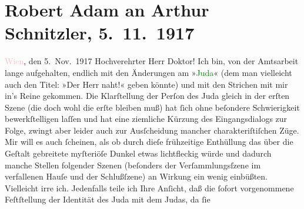 

               \section[Robert Adam an Arthur Schnitzler, 5. 11. 1917]{ Robert Adam an Arthur Schnitzler, 5. 11. 1917}\nopagebreak{}\rehead{ }\normalsize\beginnumbering{} \toendnotes[C]{\smallbreak\pagebreak[2]} 
\pstart
           \raggedleft{}{\pb}\textcolor{pink}{Wien}{}\ledrightnote{\textcolor{pink}{Wien}}, den 5. Nov. 1917\pend
           \pstart\center{}Hochverehrter Herr Doktor!\pend\pstart
           Ich bin, von der Amtsarbeit lange aufgehalten, endlich mit den Änderungen am »\textcolor{green}{Juda}{}\ledrightnote{\textcolor{green}{Das Ende des Judas}}« (dem man vielleicht auch den Titel: »Der
                    Herr naht!« geben könnte) und mit den Strichen mit mir in’s Reine gekommen. Die
                    Klarſtellung der Perſon des Juda gleich in der erſten Szene (die doch wohl die
                    erſte bleiben muß) hat ſich ohne beſondere Schwierigkeit bewerkſtelligen laſſen
                    und hat eine ziemliche Kürzung des Eingangsdialogs zur Folge, zwingt aber leider
                    auch zur Ausſcheidung mancher charakteriſtiſchen Züge. Mir will es auch
                    ſcheinen,  als ob durch dieſe frühzeitige
                    Enthüllung das über die Geſtalt gebreitete myſteriöſe Dunkel etwas lichtfleckig
                    würde und  dadurch manche Stellen folgender
                    Szenen (beſonders der Verſammlungsſzene im verfallenen Hauſe und der
                    Schlußſzene) {\pb}an Wirkung ein wenig
                    einbüßten. Vielleicht irre ich. Jedenfalls teile ich Ihre Anſicht, daß die
                    ſofort vorgenommene Feſtſtellung der Identität des Juda mit dem Judas, da ſie
